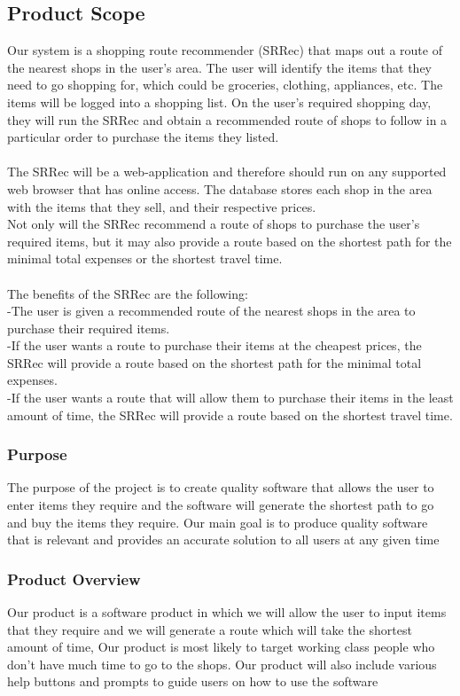 \documentclass[12pt]{article}
\begin{document}
 \subsection{Product Scope} 
Our system is a shopping route recommender (SRRec) that maps out a route of the nearest shops in the user's area. The user will identify the items that they need to go shopping for, which could be groceries, clothing, appliances, etc. The items will be logged into a shopping list. On the user's required shopping day, they will run the SRRec and obtain a recommended route of shops to follow in a particular order to purchase the items they listed.\\\\
The SRRec will be a web-application and therefore should run on any supported web browser that has online access. The database stores each shop in the area with the items that they sell, and their respective prices.\\
Not only will the SRRec recommend a route of shops to purchase the user's required items, but it may also provide a route based on the shortest path for the minimal total expenses or the shortest travel time.\\\\
The benefits of the SRRec are the following:\\
-The user is given a recommended route of the nearest shops in the area to purchase their required items.\\
-If the user wants a route to purchase their items at the cheapest prices, the SRRec will provide a route based on the shortest path for the minimal total expenses.\\
-If the user wants a route that will allow them to purchase their items in the least amount of time, the SRRec will provide a route based on the shortest travel time.

\subsubsection{Purpose}
The purpose of the project is to create quality software that allows 
the user to enter items they require and the software will generate the shortest
path to go and buy the items they require. Our main goal is to produce quality software
that is relevant and provides an accurate solution to all users at any given time

\subsubsection{Product Overview}
Our product is a software product in which we will allow the user to input 
items that they require and we will generate a route which will take the shortest amount
of time, Our product is most likely to target working class people who don't have much time 
to go to the shops. Our product will also include various help buttons and prompts to guide 
users on how to use the software 
\end{document}

